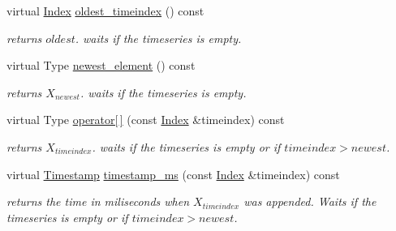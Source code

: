 \begin{DoxyCompactItemize}
virtual \hyperlink{classreal__time__tools_1_1ThreadsafeTimeseries_a9364696c534468d7ad927883b16ca981}{Index} \hyperlink{classreal__time__tools_1_1ThreadsafeTimeseries_a028364ef9654e90a3177dccabaafa098}{oldest\+\_\+timeindex} () const
\begin{DoxyCompactList}\small\item\em returns $ oldest $. waits if the timeseries is empty. \end{DoxyCompactList}\item 
\mbox{\label{classreal__time__tools_1_1ThreadsafeTimeseries_a6c55830c23d7b4c1080d560b4ad57def}} 
virtual Type \hyperlink{classreal__time__tools_1_1ThreadsafeTimeseries_a6c55830c23d7b4c1080d560b4ad57def}{newest\+\_\+element} () const
\begin{DoxyCompactList}\small\item\em returns $ X_{newest} $. waits if the timeseries is empty. \end{DoxyCompactList}\item 
\mbox{\label{classreal__time__tools_1_1ThreadsafeTimeseries_af4219a1cbd483b9a0c8aac3537db090d}} 
virtual Type \hyperlink{classreal__time__tools_1_1ThreadsafeTimeseries_af4219a1cbd483b9a0c8aac3537db090d}{operator\mbox{[}$\,$\mbox{]}} (const \hyperlink{classreal__time__tools_1_1ThreadsafeTimeseries_a9364696c534468d7ad927883b16ca981}{Index} \&timeindex) const
\begin{DoxyCompactList}\small\item\em returns $ X_{timeindex} $. waits if the timeseries is empty or if $timeindex > newest $. \end{DoxyCompactList}\item 
\mbox{\label{classreal__time__tools_1_1ThreadsafeTimeseries_a621ca3e515dabe112f27fddefe4b3dda}} 
virtual \hyperlink{classreal__time__tools_1_1ThreadsafeTimeseries_a41e36f99889a580ce56491e573fa77b0}{Timestamp} \hyperlink{classreal__time__tools_1_1ThreadsafeTimeseries_a621ca3e515dabe112f27fddefe4b3dda}{timestamp\+\_\+ms} (const \hyperlink{classreal__time__tools_1_1ThreadsafeTimeseries_a9364696c534468d7ad927883b16ca981}{Index} \&timeindex) const
\begin{DoxyCompactList}\small\item\em returns the time in miliseconds when $ X_{timeindex} $ was appended. Waits if the timeseries is empty or if $timeindex > newest $. \end{DoxyCompactList}\item 

\end{DoxyCompactItemize}
